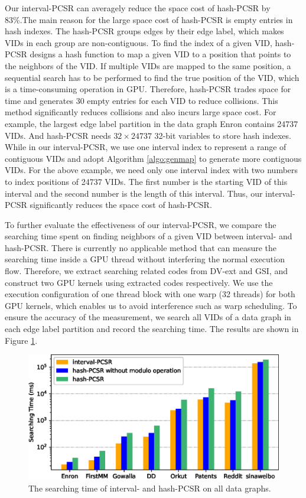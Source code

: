 Our interval-PCSR can averagely reduce the space cost of hash-PCSR by 83\%.The main reason for the large space cost of hash-PCSR is empty entries in hash indexes. The hash-PCSR groups edges by their edge label, which makes VIDs in each group are non-contiguous. To find the index of a given VID, hash-PCSR designs a hash function to map a given VID to a position that points to the neighbors of the VID. If multiple VIDs are mapped to the same position, a sequential search has to be performed to find the true position of the VID, which is a time-consuming operation in GPU. Therefore, hash-PCSR trades space for time and generates 30 empty entries for each VID to reduce collisions. This method significantly reduces collisions and also incurs large space cost. For example, the largest edge label partition in the data graph Enron contains 24737 VIDs. And hash-PCSR needs $32 \times 24737$ 32-bit variables to store hash indexes. While in our interval-PCSR, we use one interval index to represent a range of contiguous VIDs and adopt Algorithm \ref{algo:genmap} to generate more contiguous VIDs. For the above example, we need only one interval index with two numbers to index positions of 24737 VIDs. The first number is the starting VID of this interval and the second number is the length of this interval. Thus, our interval-PCSR significantly reduces the space cost of hash-PCSR.

To further evaluate the effectiveness of our interval-PCSR, we compare the searching time spent on finding neighbors of a given VID between interval- and hash-PCSR. There is currently no applicable method that can measure the searching time inside a GPU thread without interfering the normal execution flow. Therefore, we extract searching related codes from DV-ext and GSI, and construct two GPU kernels using extracted codes respectively. We use the execution configuration of one thread block with one warp (32 threads) for both GPU kernels, which enables us to avoid interference such as warp scheduling. To ensure the accuracy of the measurement, we search all VIDs of a data graph in each edge label partition and record the searching time. The results are shown in Figure \ref{fig:searchtime}.
\begin{figure}
\centering
\includegraphics[width=\columnwidth]{./figure/accesstime.eps}
\caption{The searching time of interval- and hash-PCSR on all data graphs.}	
\label{fig:searchtime}
\end{figure}

